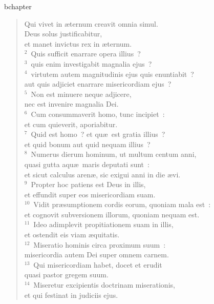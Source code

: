 bchapter\begin{verse}\vspace{-19pt}Qui vivet in \ae ternum creavit omnia simul.\\ Deus solus justificabitur,\\ et manet invictus rex in \ae ternum.\\
${}^{2}$~Quis sufficit enarrare opera illius~?\\
${}^{3}$~quis enim investigabit magnalia ejus~?\\
${}^{4}$~virtutem autem magnitudinis ejus quis enuntiabit~?\\ aut quis adjiciet enarrare misericordiam ejus~?\\
${}^{5}$~Non est minuere neque adjicere,\\ nec est invenire magnalia Dei.\\
${}^{6}$~Cum consummaverit homo, tunc incipiet~:\\ et cum quieverit, aporiabitur.\\
${}^{7}$~Quid est homo~? et qu\ae\ est gratia illius~?\\ et quid bonum aut quid nequam illius~?\\
${}^{8}$~Numerus dierum hominum, ut multum centum anni,\\ quasi gutta aqu\ae\ maris deputati sunt~:\\ et sicut calculus aren\ae , sic exigui anni in die \ae vi.\\
${}^{9}$~Propter hoc patiens est Deus in illis,\\ et effundit super eos misericordiam suam.\\
${}^{10}$~Vidit pr\ae sumptionem cordis eorum, quoniam mala est~:\\ et cognovit subversionem illorum, quoniam nequam est.\\
${}^{11}$~Ideo adimplevit propitiationem suam in illis,\\ et ostendit eis viam \ae quitatis.\\
${}^{12}$~Miseratio hominis circa proximum suum~:\\ misericordia autem Dei super omnem carnem.\\
${}^{13}$~Qui misericordiam habet, docet et erudit\\ quasi pastor gregem suum.\\
${}^{14}$~Miseretur excipientis doctrinam miserationis,\\ et qui festinat in judiciis ejus.\end{verse}


